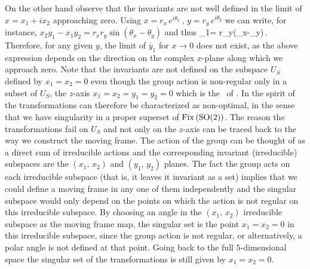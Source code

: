 On the other hand observe that the invariants are not well defined
in the limit of $x=x_1+i x_2$ approaching zero. 
Using $x=r_x\, e^{i\theta_x}\,,\, y=r_y\, e^{i\theta_y}$ we can write, 
for instance, $x_2 y_1-x_1 y_2 = r_x r_y \sin(\theta_x-\theta_y)$
and thus
\beq
        _1= r_y\sin(\theta_x-\theta_y)\,.
\eeq
Therefore, for any given $y$, the limit of $\overline{y}_1$ for $x \rightarrow 0$ 
does not exist, as the above expression depends on the direction
on the complex $x$-plane along which we approach zero. 
Note that the invariants are not defined on
the subspace $U_S$ defined by $x_1=x_2=0$ even though the
group action is non-regular only in a subset of $U_S$, the
$z$-axis $x_1=x_2=y_1=y_2=0$ which is the \fixedsp\ of . 
In the spirit of  the transformations  
can therefore be characterized as non-optimal, in the sense 
that we have singularity in a proper superset of $\mathrm{Fix}\left(\textrm{SO}(2)\right)$. 
The reason the transformations fail on $U_S$ and not only on the $z$-axis
can be traced back to the way we construct the moving frame. The action
of the group can be thought of as a direct sum of irreducible
actions and the corresponding invariant (irreducible)
subspaces are the $(x_1,\,x_2)$ and $(y_1,\,y_2)$
planes.
The
fact the group acts on each irreducible subspace (that is, it
leaves it invariant as a set) implies that we could define a
moving frame in any one of them independently and the
singular subspace would only depend on the points on which
the action is not regular on this irreducible subspace. By
choosing an angle in the $(x_1,\,x_2)$ irreducible subspace
as the moving frame map, the singular set is the point
$x_1=x_2=0$ in this irreducible subspace, since the group
action is not regular, or alternatively, a polar
angle is not defined at that point. Going back to the full
$5$-dimensional space the singular set of the transformations
is still given by $x_1=x_2=0$.

